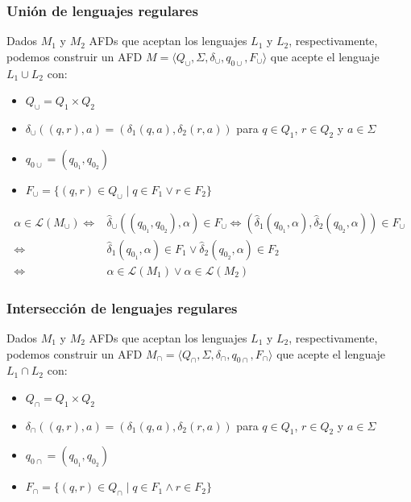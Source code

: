 \subsubsection{Unión de lenguajes regulares}
Dados \(M_1\) y \(M_2\) AFDs que aceptan los lenguajes \(L_1\) y \(L_2\), respectivamente, podemos construir un AFD \(M = \langle Q_{\cup}, \Sigma, \delta_{\cup}, q_{0\cup}, F_{\cup}\rangle\) que acepte el lenguaje \(L_1 \cup L_2\) con:
\begin{itemize}
  \item \(Q_{\cup} = Q_1 \times Q_2\)
  \item \(\delta_{\cup}((q,r), a) = (\delta_1(q,a),\delta_2(r,a)) \) para \(q\in Q_1\), \(r\in Q_2\) y \(a\in\Sigma\)
  \item \(q_{0\cup} = (q_{0_1},q_{0_2})\)
  \item \(F_{\cup} = \{(q,r)\in Q_{\cup} \mid q\in F_1 \lor r\in F_2\}\)
\end{itemize}
\begin{demo}[0.8\textwidth]
  \begin{align*}
    \alpha\in\mathcal{L}(M_\cup) \iff & \hat\delta_\cup((q_{0_1}, q_{0_2}), \alpha) \in F_\cup \iff (\hat\delta_1(q_{0_1}, \alpha), \hat\delta_2(q_{0_2}, \alpha)) \in F_\cup \\ \iff &\hat\delta_1(q_{0_1}, \alpha) \in F_1 \lor \hat\delta_2(q_{0_2}, \alpha) \in F_2 \\
    \iff                              & \alpha\in\mathcal{L}(M_1) \lor \alpha\in\mathcal{L}(M_2)
  \end{align*}
\end{demo}

\subsubsection{Intersección de lenguajes regulares}
Dados \(M_1\) y \(M_2\) AFDs que aceptan los lenguajes \(L_1\) y \(L_2\), respectivamente, podemos construir un AFD \(M_\cap = \langle Q_{\cap}, \Sigma, \delta_{\cap}, q_{0\cap}, F_{\cap}\rangle\) que acepte el lenguaje \(L_1 \cap L_2\) con:
\begin{itemize}
  \item \(Q_{\cap} = Q_1 \times Q_2\)
  \item \(\delta_{\cap}((q,r), a) = (\delta_1(q,a),\delta_2(r,a)) \) para \(q\in Q_1\), \(r\in Q_2\) y \(a\in\Sigma\)
  \item \(q_{0\cap} = (q_{0_1},q_{0_2})\)
  \item \(F_{\cap} = \{(q,r)\in Q_{\cap} \mid q\in F_1 \land r\in F_2\}\)
\end{itemize}

